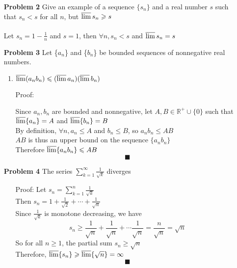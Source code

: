\documentclass[a4paper,12pt]{report}
\begin{document}
\begin{enumerate}
\begin{enumerate}
	\end{enumerate}

\item[\bf{Problem 2}] Give an example of a sequence $\{s_n\}$ and a real number $s$ such that $s_n < s$ for all $n$, but $\varlimsup s_n \geqslant s$ \\\\
	Let $s_n = 1-\frac{1}{n}$ and $s = 1$, then $\forall n, s_n < s$ and $\varlimsup s_n = s$
	
\item[\bf{Problem 3}] Let \{$a_n$\} and \{$b_n$\} be bounded sequences of nonnegative real numbers.
	\begin{enumerate}
	\item $\varlimsup(a_n b_n) \leqslant (\varlimsup a_n)(\varlimsup b_n)$ \\
	\item[Proof:]
	
	Since $a_n, b_n$ are bounded and nonnegative, let $A,B \in \mathbb{R}^+ \cup  \{0\}$ such that $\varlimsup \{a_n\} = A$ and $\varlimsup \{b_n\} = B$ \\
	By definition, $\forall n, a_n \leqslant A$ and $b_n \leqslant B$, so $a_n b_n \leqslant AB$ \\
	$AB$ is thus an upper bound on the sequence $\{a_n b_n\}$ \\ 
	Therefore $\varlimsup \{a_n b_n\} \leqslant AB$	
	\[\blacksquare\]
	\end{enumerate}
	
\item[\bf{Problem 4}] The series $\sum\limits_{k=1}^{\infty} \frac{1}{\sqrt{k}}$ diverges
	\begin{enumerate}
	\item[Proof:] Let $s_n = \sum\limits_{k=1}^{n} \frac{1}{\sqrt{k}}$ \\
	Then $s_n = 1 + \frac{1}{\sqrt{2}} + \cdots + \frac{1}{\sqrt{n}}$ \\
	Since $\frac{1}{\sqrt{k}}$ is monotone decreasing, we have
	\[
		s_n \geqslant 
		\frac{1}{\sqrt{n}} + \frac{1}{\sqrt{n}} + \cdots \frac{1}{\sqrt{n}}
		= \frac{n}{\sqrt{n}} = \sqrt{n}
	\]
	So for all $n \geqslant 1$, the partial sum $s_n \geqslant \sqrt{n}$ \\
	Therefore, $\varlimsup\{s_n\} \geqslant \varlimsup\{\sqrt{n}\} = \infty$ 
	\[\blacksquare\]
	\end{enumerate}

\end{enumerate}
\end{document}
